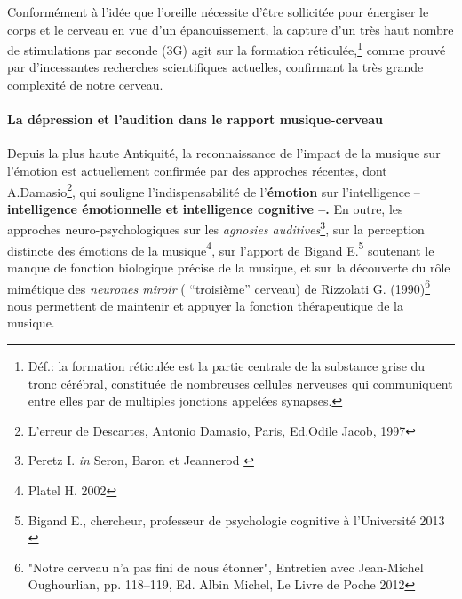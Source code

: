 Conformément à l'idée que l'oreille nécessite d'être sollicitée pour
énergiser le corps et le cerveau en vue d'un épanouissement, la
capture d'un très haut nombre de stimulations par seconde (3G) agit
sur la formation réticulée,\footnote{Déf.: la formation 
réticulée est la partie centrale de la substance grise du tronc cérébral, 
constituée de nombreuses cellules nerveuses qui communiquent entre elles par de 
multiples jonctions appelées synapses.}
comme prouvé par d'incessantes recherches scientifiques actuelles,
confirmant la très grande complexité de notre cerveau.






                

\paragraph{ La dépression et l'audition dans le rapport
  musique-cerveau}

Depuis la plus haute Antiquité,  la reconnaissance de
l'impact de la musique sur l'émotion est actuellement confirmée par
des approches récentes, dont A.Damasio\footnote {{L'erreur de
    Descartes}, Antonio Damasio, Paris, 
Ed.Odile Jacob, 1997}, qui souligne l'indispensabilité de l'\textbf{émotion}
sur l'intelligence --  \textbf{intelligence émotionnelle et intelligence
cognitive --.}
En outre, les approches neuro-psychologiques sur les \textit{agnosies
  auditives}\footnote {Peretz
  I. \textit{in} Seron, Baron et Jeannerod \autocite[<<\,Les agnosies auditives\,>>,
  pp. 205--216]{seron.baron.ea:neuropsychologie}},
sur la perception distincte des émotions de la musique\footnote
{Platel H. 2002\autocite[pp. 223--224]{platel_neuropsychology_2002}}, 
sur l'apport de Bigand E.\footnote {Bigand E., chercheur, professeur 
de psychologie cognitive à l'Université 2013 \autocite[Ch. 3
p. 35, "Vous avez l'oreille musicale"]{bigand:cerveau} } soutenant le
manque de fonction biologique précise de la musique,
et sur la
découverte du rôle mimétique des\textit{ neurones miroir }( ``troisième''
cerveau) de Rizzolati G. (1990)\footnote{"Notre cerveau n'a pas fini de nous étonner", Entretien avec Jean-Michel 
     Oughourlian, pp. 118--119, Ed. Albin Michel, Le Livre de Poche
     2012} nous permettent de maintenir et
appuyer 
la fonction thérapeutique de la musique.








